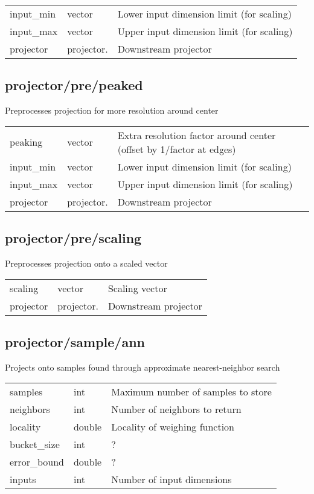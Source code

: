 \noindent\begin{tabular}{@{}lll@{}}
input\_min&vector&Lower input dimension limit (for scaling)\\
input\_max&vector&Upper input dimension limit (for scaling)\\
projector&projector.&Downstream projector\\
\end{tabular}
\subsection{projector/pre/peaked}
\noindent Preprocesses projection for more resolution around center\\

\noindent\begin{tabular}{@{}lll@{}}
peaking&vector&Extra resolution factor around center (offset by 1/factor at edges)\\
input\_min&vector&Lower input dimension limit (for scaling)\\
input\_max&vector&Upper input dimension limit (for scaling)\\
projector&projector.&Downstream projector\\
\end{tabular}
\subsection{projector/pre/scaling}
\noindent Preprocesses projection onto a scaled vector\\

\noindent\begin{tabular}{@{}lll@{}}
scaling&vector&Scaling vector\\
projector&projector.&Downstream projector\\
\end{tabular}
\subsection{projector/sample/ann}
\noindent Projects onto samples found through approximate nearest-neighbor search\\

\noindent\begin{tabular}{@{}lll@{}}
samples&int&Maximum number of samples to store\\
neighbors&int&Number of neighbors to return\\
locality&double&Locality of weighing function\\
bucket\_size&int&?\\
error\_bound&double&?\\
inputs&int&Number of input dimensions\\
\end{tabular}
